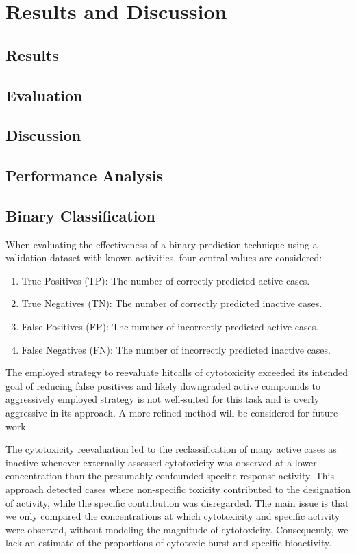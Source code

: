 \chapter{Results and Discussion}\label{chap:results_discussion}
\section{Results}\label{sec:results}
\section{Evaluation}\label{sec:evaluation}
\section{Discussion}\label{sec:discussion}
\section{Performance Analysis}\label{sec:performance_analysis}
\section{Binary Classification}\label{sec:binary_classification}
When evaluating the effectiveness of a binary prediction technique using a validation dataset with known activities, four central values are considered:

\begin{enumerate}
  \item True Positives (TP): The number of correctly predicted active cases.
  \item True Negatives (TN): The number of correctly predicted inactive cases.
  \item False Positives (FP): The number of incorrectly predicted active cases.
  \item False Negatives (FN): The number of incorrectly predicted inactive cases.
\end{enumerate}



The employed strategy to reevaluate hitcalls of cytotoxicity exceeded its intended goal of reducing false positives and likely downgraded active compounds to aggressively employed strategy is not well-suited for this task and is overly aggressive in its approach. A more refined method will be considered for future work.

The cytotoxicity reevaluation led to the reclassification of many active cases as inactive whenever externally assessed cytotoxicity was observed at a lower concentration than the presumably confounded specific response activity. This approach detected cases where non-specific toxicity contributed to the designation of activity, while the specific contribution was disregarded. The main issue is that we only compared the concentrations at which cytotoxicity and specific activity were observed, without modeling the magnitude of cytotoxicity. Consequently, we lack an estimate of the proportions of cytotoxic burst and specific bioactivity.

